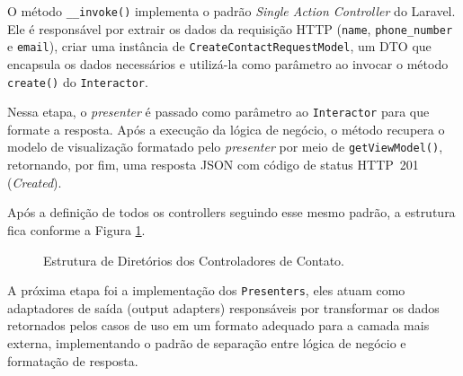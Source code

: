     \par O método \texttt{\_\_invoke()} implementa o padrão \textit{Single Action Controller} do Laravel. Ele é responsável por extrair os dados da requisição HTTP (\texttt{name}, \texttt{phone\_number} e \texttt{email}), criar uma instância de \texttt{CreateContactRequestModel}, um DTO que encapsula os dados necessários e utilizá-la como parâmetro ao invocar o método \texttt{create()} do \texttt{Interactor}. 
    
    \par Nessa etapa, o \textit{presenter} é passado como parâmetro ao \texttt{Interactor} para que formate a resposta. Após a execução da lógica de negócio, o método recupera o modelo de visualização formatado pelo \textit{presenter} por meio de \texttt{getViewModel()}, retornando, por fim, uma resposta JSON com código de status HTTP~201 (\textit{Created}).

    
    


    \par Após a definição de todos os controllers seguindo esse mesmo padrão, a estrutura fica conforme a Figura \ref{fig:estrutura-contact-controllers}.

    \begin{figure}[H]
        \caption{Estrutura de Diretórios dos Controladores de Contato.}
        \label{fig:estrutura-contact-controllers}
        
    \end{figure}

    \par A próxima etapa foi a implementação dos \texttt{Presenters}, eles atuam como adaptadores de saída (output adapters) responsáveis por transformar os dados retornados pelos casos de uso em um formato adequado para a camada mais externa, implementando o padrão de separação entre lógica de negócio e formatação de resposta. 
    
